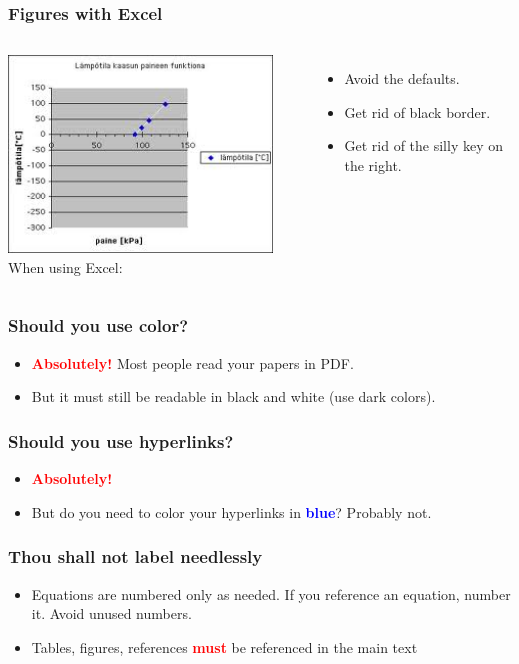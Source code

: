 \documentclass[handout]{beamer}
\newcommand{\vimportant}[1]{\textcolor{red}{\textbf{#1}}}
\newcommand{\important}[1]{\textcolor{blue}{\textbf{#1}}}
\begin{document}
\frame
{
  \frametitle{Figures with Excel}
  \begin{columns}
 \column{8cm}
  \includegraphics[width=7cm]{excel.jpeg}
 \column{3cm}
 When using Excel:
  \begin{itemize}
  \item<1->  Avoid the defaults.
  \item<2->  Get rid of black border.
  \item<3->  Get rid of the silly key on the right.
  \end{itemize}
 \end{columns}
 \vspace{1cm}

 }

\frame
{
  \frametitle{Should you use color?}

   \begin{itemize}
  \item<1-> \vimportant{Absolutely!} Most people read your papers in PDF.
  \item<2-> But it must still be readable in black and white (use dark colors).
  \end{itemize}
}


\frame
{
  \frametitle{Should you use hyperlinks?}

   \begin{itemize}
  \item<1->  \vimportant{Absolutely! }
  \item<2-> But do you need to color your hyperlinks in \important{blue}? Probably not.
  \end{itemize}
}
\frame
{
  \frametitle{Thou shall not label needlessly}

    \begin{itemize}
  \item<1-> Equations are numbered only as needed. If you reference an equation, number it. Avoid unused numbers.
   \item<2-> Tables, figures, references \vimportant{\LARGE must} be referenced in the main text
    \end{itemize}

}
\end{document}
